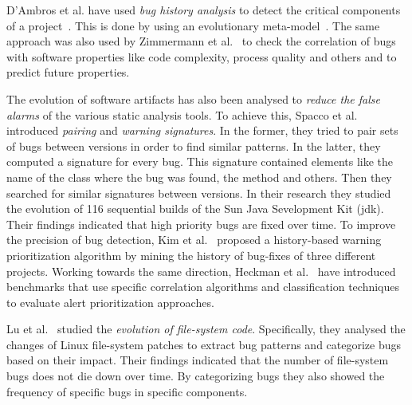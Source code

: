 \documentclass{sig-alternate}
\begin{document}
D'Ambros et al. have used {\it bug history analysis} to detect
the critical components of a project~\cite{D08}. This is done by using an
evolutionary meta-model~\cite{DL08}. The same approach was
also used by Zimmermann et al.~\cite{ZNA08} to check the correlation
of bugs with software properties like code complexity, process quality and others
and to predict future properties.

The evolution of software artifacts has also been analysed to {\it reduce the false
alarms} of the various static analysis tools. To achieve this, Spacco et
al.~\cite{SHP06} introduced {\it pairing} and {\it warning signatures}. In the
former, they tried to pair sets of bugs between versions in order to find
similar patterns. In the latter, they computed a signature for every bug. This
signature contained elements like the name of the class where the bug was found,
the method and others. Then they searched for similar signatures between
versions. In their research they studied the evolution of 116 sequential
builds of the Sun Java Sevelopment Kit ({\sc jdk}). Their findings indicated that
high priority bugs are fixed over time. To improve the precision of bug
detection, Kim et al.~\cite{KE07b} proposed a history-based warning
prioritization algorithm by mining the history of bug-fixes of three
different projects. Working towards the same direction, Heckman
et al.~\cite{HW09,HW08} have introduced benchmarks that use specific
correlation algorithms and classification techniques to evaluate alert
prioritization approaches.

Lu et al.~\cite{LAAL13} studied the {\it evolution of file-system code}.
Specifically, they analysed the changes of Linux file-system patches to extract
bug patterns and categorize bugs based on their impact. Their findings
indicated that the number of file-system bugs does not die down over time. By
categorizing bugs they also showed the frequency of specific bugs in specific
components.
\end{document}
